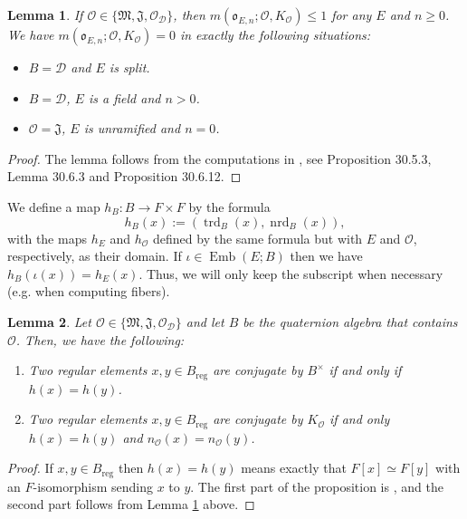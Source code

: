 \documentclass{article}
\newtheorem{lem}{Lemma}[section]
\theoremstyle{named}
\newcommand{\D}{\mathcal{D}}
\newcommand{\M}{\mathfrak{M}}
\newcommand{\J}{\mathfrak{J}}
\renewcommand{\O}{\mathcal{O}}
\renewcommand{\o}{\mathfrak{o}}
\DeclareMathOperator{\reg}{reg}
\DeclareMathOperator{\Emb}{Emb}
\DeclareMathOperator{\nrd}{nrd}
\DeclareMathOperator{\trd}{trd}
\begin{document}
\begin{lem}\label{lem:optimalembeddingsKO}
If $\O \in \{\M, \J, \O_\D\}$, then $m(\o_{E, n}; \O, K_\O) \leq 1$ for any $E$ and $n\geq 0$. We have $m(\o_{E, n}; \O, K_\O) = 0$ in exactly the following situations:
\begin{itemize}
    \item $B = \D$ and $E$ is split.
    \item $B = \D$, $E$ is a field and $n > 0$.
    \item $\O = \J$, $E$ is unramified and $n = 0$.
\end{itemize} 
\end{lem}
\begin{proof}
The lemma follows from the computations in \cite[Chapter 30]{voight}, see Proposition 30.5.3, Lemma 30.6.3 and Proposition 30.6.12.
\end{proof}

We define a map $h_B: B \rightarrow F\times F$ by the formula 
\begin{equation}\label{eq:defiofh}
    h_B(x) := (\trd_B(x), \nrd_B(x)),
\end{equation}
with the maps $h_E$ and $h_\O$ defined by the same formula but with $E$ and $\O$, respectively, as their domain. If $\iota \in \Emb(E; B)$ then we have $h_B(\iota(x)) = h_E(x)$. Thus, we will only keep the subscript when necessary (e.g. when computing fibers).

\begin{lem}\label{lem:conjugacyBtimesandKO}
Let $\O \in \{\M, \J, \O_\D\}$ and let $B$ be the quaternion algebra that contains $\O$. Then, we have the following:
\begin{enumerate}
    \item [i)] Two regular elements $x, y \in B_{\reg}$ are conjugate by $B^\times$ if and only if $h(x) = h(y)$. 
    \item [ii)] Two regular elements $x, y \in B_{\reg}$ are conjugate by $K_\O$ if and only $h(x) = h(y)$ and $n_\O(x) = n_\O(y)$.
\end{enumerate}
\end{lem}
\begin{proof}
If $x, y \in B_{\reg}$ then $h(x) = h(y)$ means exactly that $F[x] \simeq F[y]$ with an $F$-isomorphism sending $x$ to $y$. The first part of the proposition is \cite[Corollary 7.1.5]{voight}, and the second part follows from Lemma \ref{lem:optimalembeddingsKO} above.
\end{proof}
\end{document}
